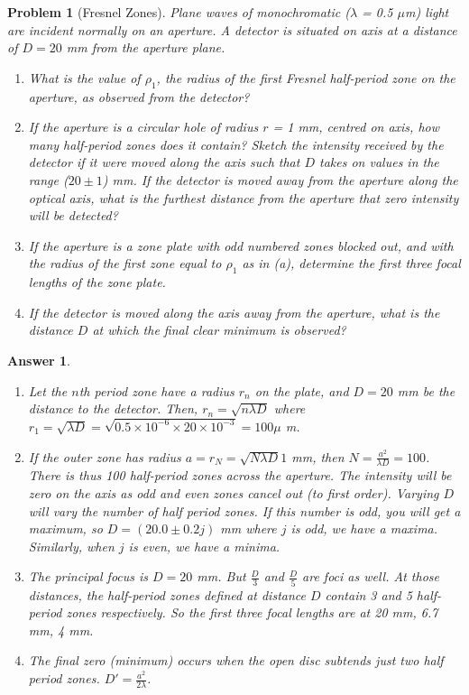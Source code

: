 \documentclass[a4paper]{article}
\newtheorem{ans}{Answer}[section]
\theoremstyle{new}
\newtheorem{qns}{Problem}[section]
\begin{document}
\begin{qns}[Fresnel Zones]
Plane waves of monochromatic ($\lambda$ = 0.5 $\mu$m) light are incident normally on an aperture. A
detector is situated on axis at a distance of $D = 20$ mm from the aperture plane.
\begin{enumerate}[label=(\alph*)]
    \item What is the value of $\rho_1$, the radius of the first Fresnel half-period zone on the aperture, as observed from the detector?
    \item If the aperture is a circular hole of radius $r$ = 1 mm, centred on axis, how many half-period zones does it contain? Sketch the intensity received by the detector if it were moved along the axis such that $D$ takes on values in the range ($20\pm 1$) mm. If the detector is moved away from the aperture along the optical axis, what is the furthest distance from the aperture that zero intensity will be detected?
    \item If the aperture is a zone plate with odd numbered zones blocked out, and with the radius of the first zone equal to $\rho_1$ as in (a), determine the first three focal lengths of the zone plate.
    \item If the detector is moved along the axis away from the aperture, what is the distance $D$ at which the final clear minimum is observed?
\end{enumerate}
\end{qns}
\newpage
\begin{ans}\leavevmode
\begin{enumerate}[label=(\alph*)]
\item Let the $n$th period zone have a radius $r_n$ on the plate, and $D=20$ mm be the distance to the detector. Then, $r_n=\sqrt{n\lambda D}$ where $r_1=\sqrt{\lambda D}=\sqrt{0.5\times10^{-6}\times 20\times10^{-3}}=100\mu$ m.
\item If the outer zone has radius $a=r_N=\sqrt{N\lambda D}1$ mm, then $N=\frac{a^2}{\lambda D}=100$. There is thus 100 half-period zones across the aperture. The intensity will be zero on the axis as odd and even zones cancel out (to first order). Varying $D$ will vary the number of half period zones. If this number is odd, you will get a maximum, so $D=(20.0\pm 0.2 j)$ mm where $j$ is odd, we have a maxima. Similarly, when $j$ is even, we have a minima.
\item The principal focus is $D=20$ mm. But $\frac{D}{3}$ and $\frac{D}{5}$ are foci as well. At those distances, the half-period zones defined at distance $D$ contain 3 and 5 half-period zones respectively. So the first three focal lengths are at 20 mm, 6.7 mm, 4 mm.
\item The final zero (minimum) occurs when the open disc subtends just two half period zones. $D'=\frac{a^2}{2\lambda}$. 
\end{enumerate}
\end{ans}
\end{document}
